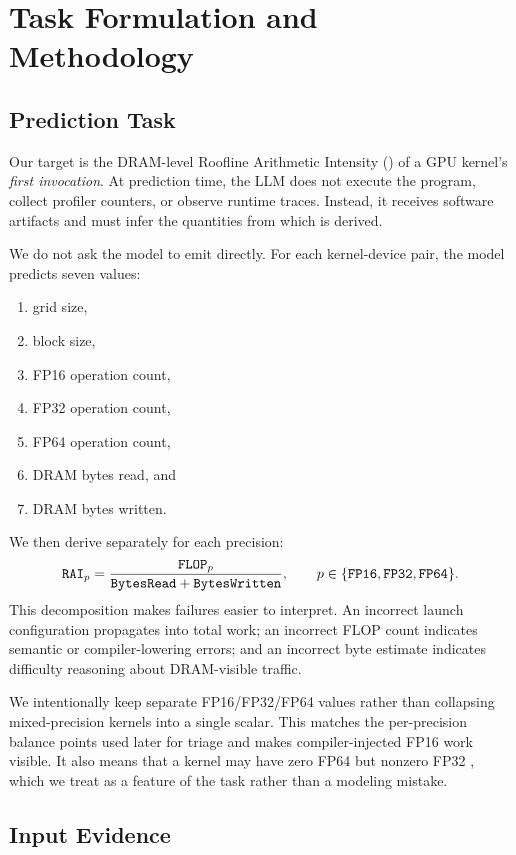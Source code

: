 \section{Task Formulation and Methodology}
\label{sec:task-methodology}

\subsection{Prediction Task}

Our target is the DRAM-level Roofline Arithmetic Intensity (\rai) of a GPU kernel's \emph{first invocation}.
At prediction time, the LLM does not execute the program, collect profiler counters, or observe runtime traces.
Instead, it receives software artifacts and must infer the quantities from which \rai is derived.

We do not ask the model to emit \rai directly.
For each kernel-device pair, the model predicts seven values:
\begin{enumerate}[leftmargin=1.2em]
  \item grid size,
  \item block size,
  \item FP16 operation count,
  \item FP32 operation count,
  \item FP64 operation count,
  \item DRAM bytes read, and
  \item DRAM bytes written.
\end{enumerate}
We then derive \rai separately for each precision:
\[
\texttt{RAI}_{p}
=
\frac{\texttt{FLOP}_{p}}
     {\texttt{BytesRead} + \texttt{BytesWritten}},
\qquad
p \in \{\texttt{FP16}, \texttt{FP32}, \texttt{FP64}\}.
\]
This decomposition makes failures easier to interpret.
An incorrect launch configuration propagates into total work; an incorrect FLOP count indicates semantic or compiler-lowering errors; and an incorrect byte estimate indicates difficulty reasoning about DRAM-visible traffic.

We intentionally keep separate FP16/FP32/FP64 \rai values rather than collapsing mixed-precision kernels into a single scalar.
This matches the per-precision balance points used later for triage and makes compiler-injected FP16 work visible.
It also means that a kernel may have zero FP64 \rai but nonzero FP32 \rai, which we treat as a feature of the task rather than a modeling mistake.

\subsection{Input Evidence}

